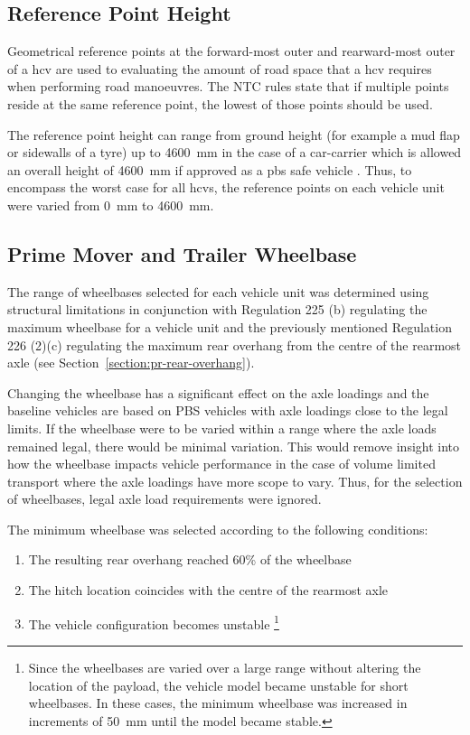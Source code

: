 \subsection{Reference Point Height}\label{section-pr-ref-point-height}

Geometrical reference points at the forward-most outer and rearward-most outer of a \gls{hcv} are used to evaluating the amount of road space that a \gls{hcv} requires when performing road manoeuvres. The NTC rules \cite{NationalTransportCommission2008} state that if multiple points reside at the same reference point, the lowest of those points should be used.

The reference point height can range from ground height (for example a mud flap or sidewalls of a tyre) up to 4600~mm in the case of a car-carrier which is allowed an overall height of 4600~mm if approved as a \gls{pbs} safe vehicle \cite{AbnormalLoadTechnicalCommittee2014}. Thus, to encompass the worst case for all \glspl{hcv}, the reference points on each vehicle unit were varied from 0~mm to 4600~mm.

\subsection{Prime Mover and Trailer Wheelbase}\label{section:pr-wheelbase}

The range of wheelbases selected for each vehicle unit was determined using structural limitations in conjunction with Regulation 225 (b) regulating the maximum wheelbase for a vehicle unit and the previously mentioned Regulation 226 (2)(c) regulating the maximum rear overhang from the centre of the rearmost axle (see Section~\ref{section:pr-rear-overhang}).

Changing the wheelbase has a significant effect on the axle loadings and the baseline vehicles are based on PBS vehicles with axle loadings close to the legal limits. If the wheelbase were to be varied within a range where the axle loads remained legal, there would be minimal variation. This would remove insight into how the wheelbase impacts vehicle performance in the case of volume limited transport where the axle loadings have more scope to vary. Thus, for the selection of wheelbases, legal axle load requirements were ignored.

The minimum wheelbase was selected according to the following conditions:

\begin{enumerate}
	\item The resulting rear overhang reached 60\% of the wheelbase
	\item The hitch location coincides with the centre of the rearmost axle
	\item The vehicle configuration becomes unstable \footnote{Since the wheelbases are varied over a large range without altering the location of the payload, the vehicle model became unstable for short wheelbases. In these cases, the minimum wheelbase was increased in increments of 50~mm until the model became stable.}
\end{enumerate}

